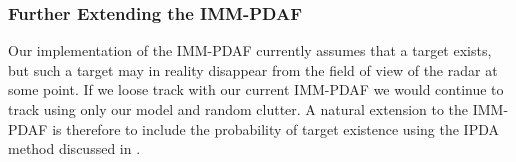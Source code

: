 \subsubsection{Further Extending the IMM-PDAF}
Our implementation of the IMM-PDAF currently assumes that a target exists, but such a target may in reality disappear from the field of view of the radar at some point. If we loose track with our current IMM-PDAF we would continue to track using only our model and random clutter. A natural extension to the IMM-PDAF is therefore to include the probability of target existence using the IPDA method discussed in \cite{imm-ipda}.
